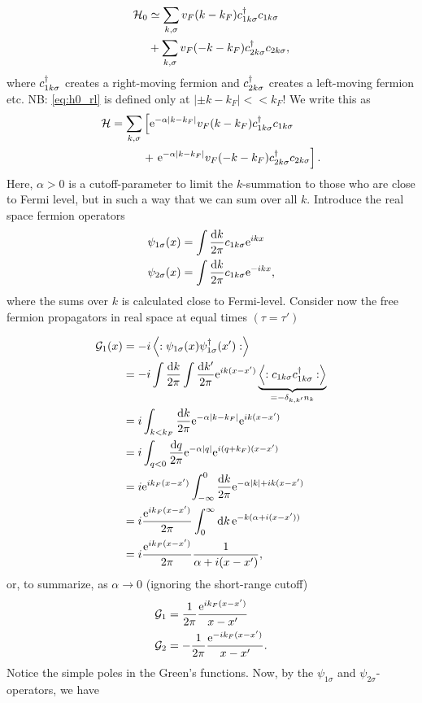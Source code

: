 \begin{align}
\label{eq:h0_rl}
\begin{split}
\mathcal{H}_0 &\simeq \sum_{k,\sigma}v_F(k-k_F)c^{\dagger}_{1k\sigma}c_{1k\sigma} \\
&+\sum_{k,\sigma}v_F(-k-k_F)c^{\dagger}_{2k\sigma}c_{2k\sigma},
\end{split}
\end{align}
where $c^{\dagger}_{1k\sigma}$ creates a right-moving fermion and $c^{\dagger}_{2k\sigma}$ creates a left-moving fermion etc.
NB: \ref{eq:h0_rl} is defined only at $|\pm k-k_F|<<k_F$!
We write this as
\begin{align}
\begin{split}
\mathcal{H}=\sum_{k,\sigma}&\left[\mathrm{e}^{-\alpha|k-k_F|}v_F(k-k_F)c^{\dagger}_{1k\sigma}c_{1k\sigma}\right. \\
&+\left.\mathrm{e}^{-\alpha|k-k_F|}v_F(-k-k_F)c^{\dagger}_{2k\sigma}c_{2k\sigma}\right].
\end{split}
\end{align}
Here, $\alpha>0$ is a cutoff-parameter to limit the $k$-summation to those who are close to Fermi level, but in such a way that we can sum over all $k$.
Introduce the real space fermion operators
\begin{align}
\psi_{1\sigma}(x) & =\int\frac{\dd k}{2\pi}c_{1k\sigma}\mathrm{e}^{ikx} \\
\psi_{2\sigma}(x) & =\int\frac{\dd k}{2\pi}c_{1k\sigma}\mathrm{e}^{-ikx},
\end{align}
where the sums over $k$ is calculated close to Fermi-level.
Consider now the free fermion propagators in real space at equal times $(\tau = \tau')$

\begin{align*}
\mathcal{G}_1(x) &= -i\ev{:\psi_{1\sigma}(x)\psi_{1\sigma}^\dagger(x'):}\\
&= -i\int\frac{\dd k}{2\pi}\int\frac{\dd k'}{2\pi}\e^{ik(x-x')}\underbrace{\ev{:c_{1k\sigma}\cd_{1k\sigma}:}}_{=-\delta_{k,k'}n_k} \\
&=i\int_{k<k_F}\frac{\dd k}{2\pi}\e^{-\alpha|k-k_F|}\e^{ik(x-x')} \\
&= i\int_{q<0}\frac{\dd q}{2\pi}\e^{-\alpha|q|}\e^{i(q+k_F)(x-x')} \\
&=i\e^{ik_F(x-x')}\int_{-\infty}^{0}\frac{\dd k}{2\pi}\e^{-\alpha|k| + ik(x-x')}\\
&= i\frac{\e^{ik_F(x-x')}}{2\pi}\int_0^\infty\dd k\,\e^{-k(\alpha + i(x-x'))} \\
&=i\frac{\e^{ik_F(x-x')}}{2\pi}\frac{1}{\alpha + i(x-x')},
\end{align*}
or, to summarize, as $\alpha \rightarrow 0$ (ignoring the short-range cutoff)
\begin{align}
\mathcal{G}_1 &= \frac{1}{2\pi}\frac{\mathrm{e}^{ik_F(x-x')}}{x-x'} \\
\mathcal{G}_2 &= -\frac{1}{2\pi}\frac{\mathrm{e}^{-ik_F(x-x')}}{x-x'}.
\end{align}
Notice the simple poles in the Green's functions. Now, by the $\psi_{1\sigma}$ and $\psi_{2\sigma}$-operators, we have

